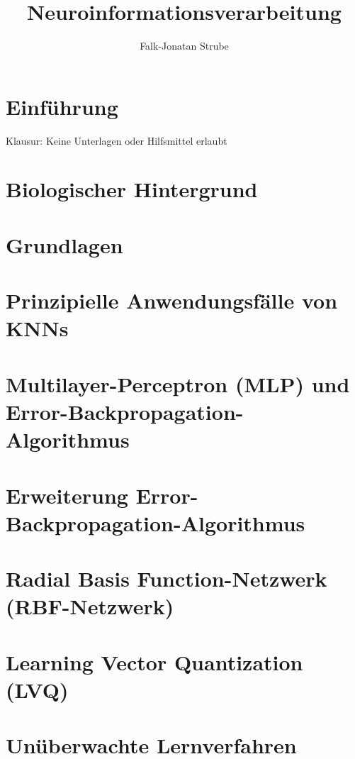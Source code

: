 \documentclass{scrreprt}
\title{Neuroinformations\-verarbeitung}
\author{Falk-Jonatan Strube}
\begin{document}
\maketitle
\tableofcontents

\chapter*{Einführung}
Klausur: Keine Unterlagen oder Hilfsmittel erlaubt

\setcounter{chapter}{-1}
\chapter{Biologischer Hintergrund}


\chapter{Grundlagen}


\chapter{Prinzipielle Anwendungsfälle von KNNs}




\chapter{Multilayer-Perceptron (MLP) und Error-Backpropagation-Algorithmus}


\chapter{Erweiterung Error-Backpropagation-Algorithmus}


\chapter{Radial Basis Function-Netzwerk (RBF-Netzwerk)}


\chapter{Learning Vector Quantization (LVQ)}


\chapter{Unüberwachte Lernverfahren}

\end{document}
